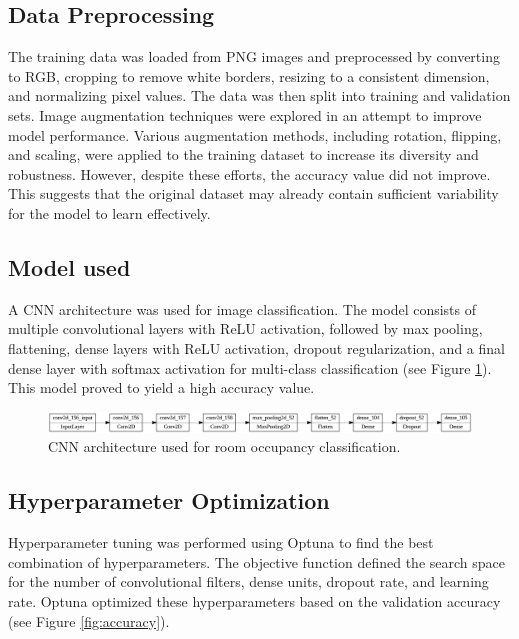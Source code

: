 \documentclass{article}
\begin{document}
\subsection{Data Preprocessing}
The training data was loaded from PNG images and preprocessed by converting to RGB, cropping to remove white borders, resizing to a consistent dimension, and normalizing pixel values. The data was then split into training and validation sets.
Image augmentation techniques were explored in an attempt to improve model performance. Various augmentation methods, including rotation, flipping, and scaling, were applied to the training dataset to increase its diversity and robustness. However, despite these efforts, the accuracy value did not improve. This suggests that the original dataset may already contain sufficient variability for the model to learn effectively.

\subsection{Model used}
A CNN architecture was used for image classification. The model consists of multiple convolutional layers with ReLU activation, followed by max pooling, flattening, dense layers with ReLU activation, dropout regularization, and a final dense layer with softmax activation for multi-class classification (see Figure \ref{fig:architecture}). This model proved to yield a high accuracy value.

\begin{figure}
    \centering
    \includegraphics[width=1\textwidth]{model_plot.png}
    \caption{CNN architecture used for room occupancy classification.}
    \label{fig:architecture}
\end{figure}

\subsection{Hyperparameter Optimization}
Hyperparameter tuning was performed using Optuna to find the best combination of hyperparameters. The objective function defined the search space for the number of convolutional filters, dense units, dropout rate, and learning rate. Optuna optimized these hyperparameters based on the validation accuracy (see Figure \ref{fig:accuracy}).
\end{document}
